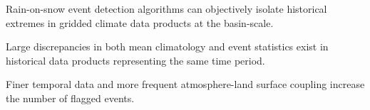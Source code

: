 \documentclass[draft]{agujournal2019}
\begin{document}





\begin{keypoints}
\item Rain-on-snow event detection algorithms can objectively isolate historical extremes in gridded climate data products at the basin-scale.
\item Large discrepancies in both mean climatology and event statistics exist in historical data products representing the same time period.
\item Finer temporal data and more frequent atmosphere-land surface coupling increase the number of flagged events.
\end{keypoints}

%
%

%
%
\end{document}
